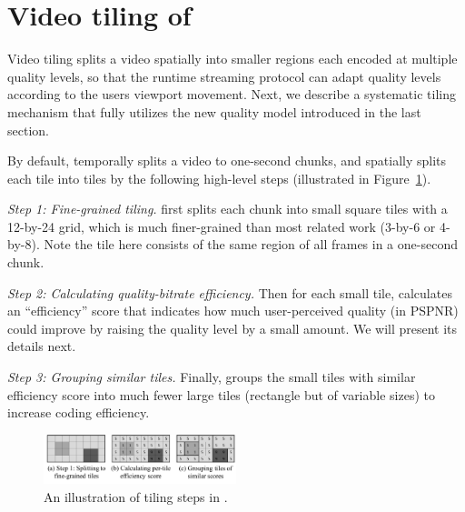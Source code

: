 
\section{Video tiling of \name}
\label{sec:tiling}

Video tiling splits a video spatially into smaller regions each encoded at multiple quality levels, so that the runtime streaming protocol can adapt quality levels according to the users viewport movement.
Next, we describe a systematic tiling mechanism that fully utilizes the new quality model introduced in the last section.

By default, \name temporally splits a video to one-second chunks, and spatially splits each tile into tiles by the following high-level steps (illustrated in Figure~\ref{fig:tiling-steps}).
\begin{packeditemize}
\item {\em Step 1: Fine-grained tiling.} 
\name first splits each chunk into small square tiles with a 12-by-24 grid, which is much finer-grained than most related work (3-by-6 or 4-by-8). Note the tile here consists of the same region of all frames in a one-second chunk.
\item {\em Step 2: Calculating quality-bitrate efficiency.} 
Then for each small tile, \name calculates an ``efficiency'' score that indicates how much user-perceived quality (in PSPNR) could improve by raising the quality level by a small amount. We will present its details next.
\item {\em Step 3: Grouping similar tiles.}
Finally, \name groups the small tiles with similar efficiency score into much fewer large tiles (rectangle but of variable sizes) to increase coding efficiency. 
\end{packeditemize}


\begin{figure}
  \centering
  \includegraphics[width=0.5\textwidth]{figures/tiling-steps.pdf}
  \caption{An illustration of tiling steps in \name.}
  \label{fig:tiling-steps}
\end{figure}

